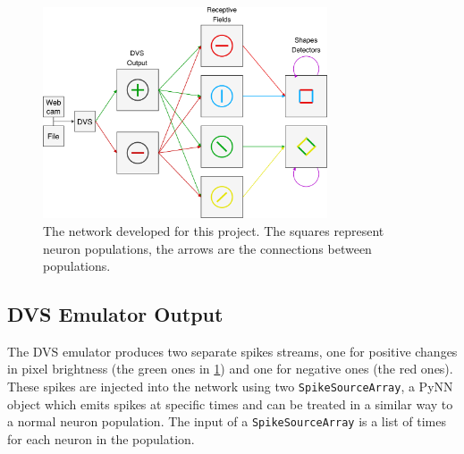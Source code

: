 \begin{figure}[ht]
\centering
\includegraphics[width=0.75\textwidth]{images/development/network.png}
\caption[Network Overview]{The network developed for this project. The squares represent neuron populations, the arrows are the connections between populations.}
\label{fig:network}
\end{figure}


\subsection{DVS Emulator Output}
The DVS emulator produces two separate spikes streams, one for positive changes in pixel brightness (the green ones in \cref{fig:network}) and one for negative ones (the red ones). These spikes are injected into the network using two \texttt{SpikeSourceArray}, a PyNN object which emits spikes at specific times and can be treated in a similar way to a normal neuron population. The input of a \texttt{SpikeSourceArray} is a list of times for each neuron in the population. 


